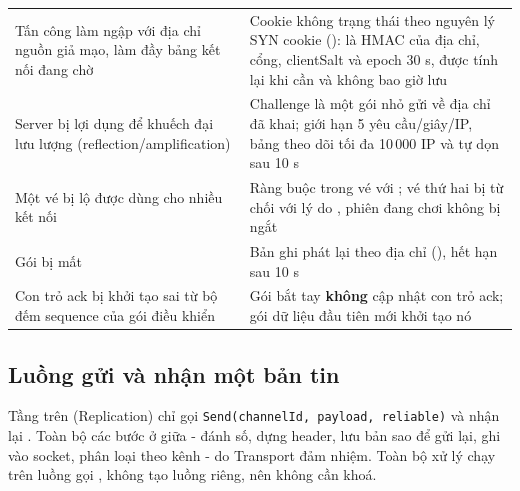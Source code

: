 \begin{center}\small
\begin{tabularx}{\linewidth}{|L{4.6cm}|Y|}
\hline
{} &  \\ \hline
Tấn công làm ngập  với địa chỉ nguồn giả mạo, làm đầy bảng kết nối đang chờ & Cookie không trạng thái theo nguyên lý SYN cookie ():  là HMAC của địa chỉ, cổng, clientSalt và epoch 30 s, được tính lại khi cần và không bao giờ lưu \\ \hline
Server bị lợi dụng để khuếch đại lưu lượng (reflection/amplification) & Challenge là một gói nhỏ gửi về địa chỉ đã khai;  giới hạn 5 yêu cầu/giây/IP, bảng theo dõi tối đa 10\,000 IP và tự dọn sau 10 s \\ \hline
Một vé bị lộ được dùng cho nhiều kết nối & Ràng buộc  trong vé với ; vé thứ hai bị từ chối với lý do , phiên đang chơi không bị ngắt \\ \hline
Gói  bị mất & Bản ghi phát lại theo địa chỉ (), hết hạn sau 10 s \\ \hline
Con trỏ ack bị khởi tạo sai từ bộ đếm sequence của gói điều khiển & Gói bắt tay \textbf{không} cập nhật con trỏ ack; gói dữ liệu đầu tiên mới khởi tạo nó \\ \hline
\end{tabularx}
\end{center}

\subsection{Luồng gửi và nhận một bản tin}
Tầng trên (Replication) chỉ gọi \texttt{Send(channelId, payload, reliable)} và nhận lại .
Toàn bộ các bước ở giữa - đánh số, dựng header, lưu bản sao để gửi lại, ghi vào socket, phân loại theo kênh - do
Transport đảm nhiệm. Toàn bộ xử lý chạy trên luồng gọi , không tạo luồng riêng, nên không cần khoá.

